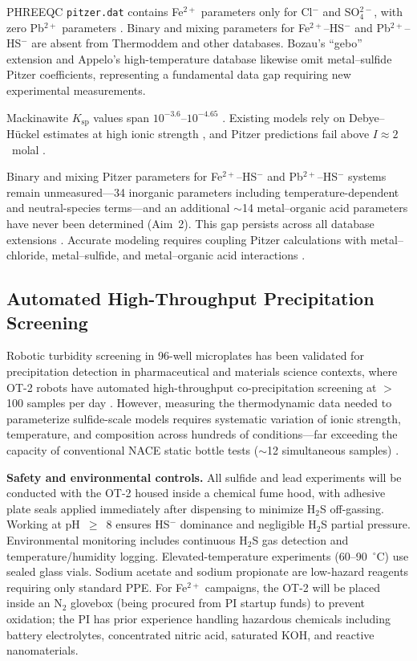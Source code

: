 \documentclass[12pt]{article}
\begin{document}
PHREEQC \texttt{pitzer.dat} contains Fe$^{2+}$ parameters only for Cl$^-$ and SO$_4^{2-}$, with zero Pb$^{2+}$ parameters \cite{wang2020}. Binary and mixing parameters for Fe$^{2+}$--HS$^-$ and Pb$^{2+}$--HS$^-$ are absent from Thermoddem and other databases. Bozau's ``gebo'' extension \cite{bozau2013} and Appelo's high-temperature database \cite{appelo2015} likewise omit metal--sulfide Pitzer coefficients, representing a fundamental data gap requiring new experimental measurements.

Mackinawite $K_{\text{sp}}$ values span $10^{-3.6}$--$10^{-4.65}$ \cite{wylde2014,wang2020}. Existing models rely on Debye--H\"uckel estimates at high ionic strength \cite{wang2020}, and Pitzer predictions fail above $I \approx 2$~molal \cite{felmy2000,alharbi2017}.

Binary and mixing Pitzer parameters for Fe$^{2+}$--HS$^-$ and Pb$^{2+}$--HS$^-$ systems remain unmeasured---34 inorganic parameters including temperature-dependent and neutral-species terms---and an additional $\sim$14 metal--organic acid parameters have never been determined (Aim~2). This gap persists across all database extensions \cite{bozau2013,appelo2015}. Accurate modeling requires coupling Pitzer calculations with metal--chloride, metal--sulfide, and metal--organic acid interactions \cite{kan2019,felmy2000}.

\subsection{Automated High-Throughput Precipitation Screening}

Robotic turbidity screening in 96-well microplates has been validated for precipitation detection in pharmaceutical \cite{dehring2004,petrusevska2013} and materials science contexts, where OT-2 robots have automated high-throughput co-precipitation screening at $>$100 samples per day \cite{velasco2021,kumbhakar2023,schuetzke2023}. However, measuring the thermodynamic data needed to parameterize sulfide-scale models requires systematic variation of ionic strength, temperature, and composition across hundreds of conditions---far exceeding the capacity of conventional NACE static bottle tests ($\sim$12 simultaneous samples) \cite{baugh2012}.

\textbf{Safety and environmental controls.} All sulfide and lead experiments will be conducted with the OT-2 housed inside a chemical fume hood, with adhesive plate seals applied immediately after dispensing to minimize H$_2$S off-gassing. Working at pH~$\geq$~8 ensures HS$^-$ dominance and negligible H$_2$S partial pressure. Environmental monitoring includes continuous H$_2$S gas detection and temperature/humidity logging. Elevated-temperature experiments (60--90~$^\circ$C) use sealed glass vials. Sodium acetate and sodium propionate are low-hazard reagents requiring only standard PPE. For Fe$^{2+}$ campaigns, the OT-2 will be placed inside an N$_2$ glovebox (being procured from PI startup funds) to prevent oxidation; the PI has prior experience handling hazardous chemicals including battery electrolytes, concentrated nitric acid, saturated KOH, and reactive nanomaterials.
\end{document}
